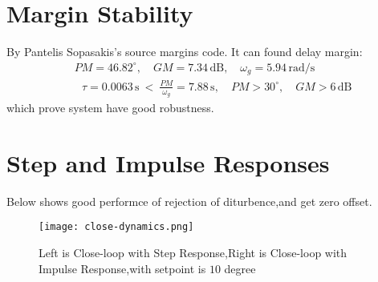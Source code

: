 \documentclass[11pt]{article}
\begin{document}
\section{Margin Stability}
By Pantelis Sopasakis's source margins code.
It can found delay margin:
\begin{equation*}
\begin{aligned}
& \text{} PM = 46.82^\circ,\quad 
  \text{}  GM = 7.34\,\text{dB},\quad 
  \omega_g = 5.94\,\text{rad/s} \\
& \text{ } \tau = 0.0063\,\text{s}\ <\ 
  \frac{PM}{\omega_g} = 7.88\,\text{s},\quad 
  PM > 30^\circ,\quad GM > 6\,\text{dB} 
\end{aligned}
\end{equation*}
which prove system have good robustness.


\section{Step and Impulse Responses}

Below shows good performce of rejection of diturbence,and get zero offset.

\begin{figure}
  \centering
  \texttt{[image: close-dynamics.png]}
  \caption{Left is Close-loop with Step Response,Right is Close-loop with Impulse Response,with setpoint is $10$ degree}
  \label{fig:example}
\end{figure}
\end{document}
